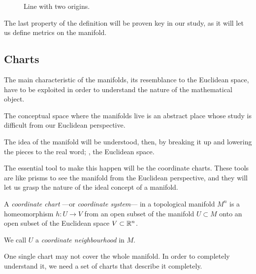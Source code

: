 \begin{figure}[bth]
    \myfloatalign
    \caption[Line with two origins]{Line with two origins.}
    \label{fig:2origin}
\end{figure}

The last property of the definition will be proven key in our study, as it will let us define metrics on the manifold.

\subsection{Charts}

The main characteristic of the manifolds, its resemblance to the Euclidean space, have to be exploited in order to understand the nature of the mathematical object.

The conceptual space where the manifolds live is an abstract place whose study is difficult from our Euclidean perspective.

The idea of the manifold will be understood, then, by breaking it up and lowering the pieces to the real word; \ie, the Euclidean space.

The essential tool to make this happen will be the coordinate charts. These tools are like prisms to see the manifold from the Euclidean perspective, and they will let us grasp the nature of the ideal concept of a manifold.

\begin{definition}
    A \emph{coordinate chart} ---or \emph{coordinate system}--- in a topological manifold $M^n$ is a homeomorphism $h \colon U \to V$ from an open subset of the manifold $U \subset M$ onto an open subset of the Euclidean space $V \subset \mathbb{R}^n$.

    We call $U$ a \emph{coordinate neighbourhood} in $M$.
\end{definition}

One single chart may not cover the whole manifold. In order to completely understand it, we need a set of charts that describe it completely.


